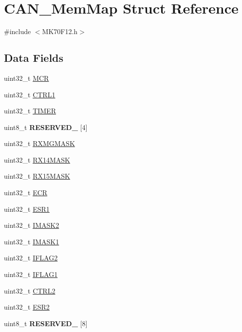 \hypertarget{struct_c_a_n___mem_map}{}\section{C\+A\+N\+\_\+\+Mem\+Map Struct Reference}
\label{struct_c_a_n___mem_map}


{\ttfamily \#include $<$M\+K70\+F12.\+h$>$}

\subsection*{Data Fields}
\begin{DoxyCompactItemize}
\item 
uint32\+\_\+t \hyperlink{struct_c_a_n___mem_map_aa78ee3ab61a8a0a9bceade6152bccec3}{M\+C\+R}
\item 
uint32\+\_\+t \hyperlink{struct_c_a_n___mem_map_aa7e5faeb995f97f465296095ec696576}{C\+T\+R\+L1}
\item 
uint32\+\_\+t \hyperlink{struct_c_a_n___mem_map_a7cdd012a6030c4bf528cec65fddb71ca}{T\+I\+M\+E\+R}
\item 
\hypertarget{struct_c_a_n___mem_map_a3a44c5c05358d3fde727247cafbf0576}{}uint8\+\_\+t {\bfseries R\+E\+S\+E\+R\+V\+E\+D\+\_} \mbox{[}4\mbox{]}\label{struct_c_a_n___mem_map_a3a44c5c05358d3fde727247cafbf0576}

\item 
uint32\+\_\+t \hyperlink{struct_c_a_n___mem_map_aa788d49d34c42aeb411ed6b43f1a7c42}{R\+X\+M\+G\+M\+A\+S\+K}
\item 
uint32\+\_\+t \hyperlink{struct_c_a_n___mem_map_ad9454220446b5a706a53b100d31c223a}{R\+X14\+M\+A\+S\+K}
\item 
uint32\+\_\+t \hyperlink{struct_c_a_n___mem_map_a4e60a1ec55f8fc14e4cdcd00e922d76d}{R\+X15\+M\+A\+S\+K}
\item 
uint32\+\_\+t \hyperlink{struct_c_a_n___mem_map_ae333e3fdb5adc42d26fa7a9b9c2014f4}{E\+C\+R}
\item 
uint32\+\_\+t \hyperlink{struct_c_a_n___mem_map_a22b3d30edd2510d48809119a334deb5c}{E\+S\+R1}
\item 
uint32\+\_\+t \hyperlink{struct_c_a_n___mem_map_a7f5ec3c75c69675f968a5d42c86d73f6}{I\+M\+A\+S\+K2}
\item 
uint32\+\_\+t \hyperlink{struct_c_a_n___mem_map_ad847310f75c51368595da91e905ad1bf}{I\+M\+A\+S\+K1}
\item 
uint32\+\_\+t \hyperlink{struct_c_a_n___mem_map_aa06064731318366c51bc3ee552491070}{I\+F\+L\+A\+G2}
\item 
uint32\+\_\+t \hyperlink{struct_c_a_n___mem_map_a9a4fc7f05bf39e47ce0bd8842a49ce2f}{I\+F\+L\+A\+G1}
\item 
uint32\+\_\+t \hyperlink{struct_c_a_n___mem_map_a41eb581b62dccef45c7217265649e0ea}{C\+T\+R\+L2}
\item 
uint32\+\_\+t \hyperlink{struct_c_a_n___mem_map_ac28986f6535a563a5790cdde8b507166}{E\+S\+R2}
\item 
\hypertarget{struct_c_a_n___mem_map_ae58a16f3c7d42f622807e4c673105991}{}uint8\+\_\+t {\bfseries R\+E\+S\+E\+R\+V\+E\+D\+\_} \mbox{[}8\mbox{]}\label{struct_c_a_n___mem_map_ae58a16f3c7d42f622807e4c673105991}


\end{DoxyCompactItemize}
